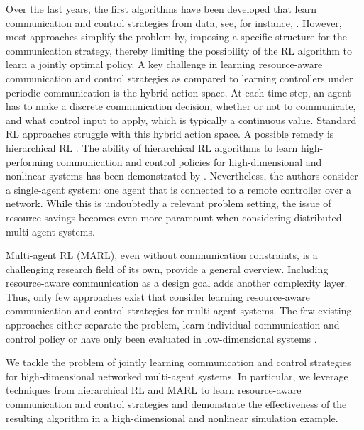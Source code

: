 \documentclass[12pt, final]{l4dc2023}
\begin{document}
Over the last years, the first algorithms have been developed that learn communication and control strategies from data, see, for instance, \cite{Vamvoudakis.2018,yang2017event,zhong2014event}.
However, most approaches simplify the problem by, \eg imposing a specific structure for the communication strategy, thereby limiting the possibility of the RL algorithm to learn a jointly optimal policy.
A key challenge in learning resource-aware communication and control strategies as compared to learning controllers under periodic communication is the hybrid action space.
At each time step, an agent has to make a discrete communication decision, whether or not to communicate, and what control input to apply, which is typically a continuous value.
Standard RL approaches struggle with this hybrid action space.
A possible remedy is hierarchical RL \citep{sutton1999between}.
The ability of hierarchical RL algorithms to learn high-performing communication and control policies for high-dimensional and nonlinear systems has been demonstrated by \cite{funk2021learning}.
Nevertheless, the authors consider a single-agent system: one agent that is connected to a remote controller over a network.
While this is undoubtedly a relevant problem setting, the issue of resource savings becomes even more paramount when considering distributed multi-agent systems.

Multi-agent RL (MARL), even without communication constraints, is a challenging research field of its own, \cite{zhang2021multi} provide a general overview.
Including resource-aware communication as a design goal adds another complexity layer.
Thus, only few approaches exist that consider learning resource-aware communication and control strategies for multi-agent systems.
The few existing approaches either separate the problem, \ie learn individual communication and control policy \citep{Demirel.2018,lima2022model} or have only been evaluated in low-dimensional systems \citep{Shibata.2021,shibata2022deep}.

We tackle the problem of jointly learning communication and control strategies for high-dimensional networked multi-agent systems. 
In particular, we leverage techniques from hierarchical RL and MARL to learn resource-aware communication and control strategies and
demonstrate the effectiveness of the resulting algorithm in a high-dimensional and nonlinear simulation example.

\end{document}
